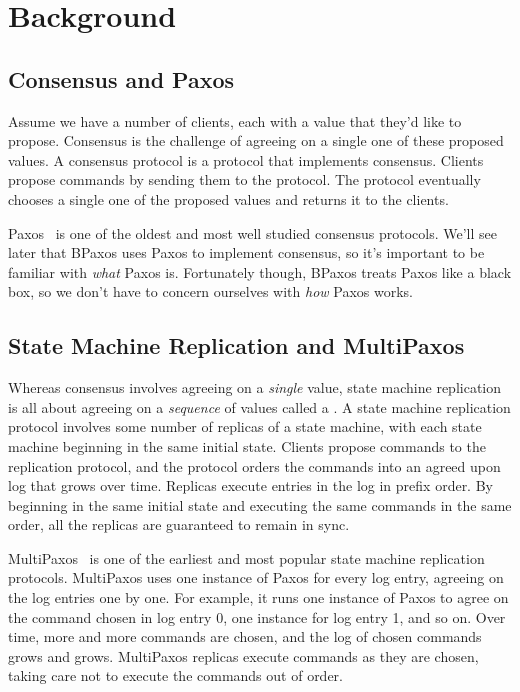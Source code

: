 \section{Background}

\subsection{Consensus and Paxos}
Assume we have a number of clients, each with a value that they'd like to
propose. Consensus is the challenge of agreeing on a single one of these
proposed values. A consensus protocol is a protocol that implements consensus.
Clients propose commands by sending them to the protocol. The protocol
eventually chooses a single one of the proposed values and returns it to the
clients.

Paxos~\cite{lamport1998part, lamport2001paxos} is one of the oldest and most
well studied consensus protocols. We'll see later that BPaxos uses Paxos to
implement consensus, so it's important to be familiar with \emph{what} Paxos
is. Fortunately though, BPaxos treats Paxos like a black box, so we don't have
to concern ourselves with \emph{how} Paxos works.

\subsection{State Machine Replication and MultiPaxos}
Whereas consensus involves agreeing on a \emph{single} value, state machine
replication is all about agreeing on a \emph{sequence} of values called a
. A state machine replication protocol involves some number of
replicas of a state machine, with each state machine beginning in the same
initial state. Clients propose commands to the replication protocol, and the
protocol orders the commands into an agreed upon log that grows over time.
Replicas execute entries in the log in prefix order. By beginning in the same
initial state and executing the same commands in the same order, all the
replicas are guaranteed to remain in sync.

MultiPaxos~\cite{van2015paxos} is one of the earliest and most popular state
machine replication protocols. MultiPaxos uses one instance of Paxos for every
log entry, agreeing on the log entries one by one. For example, it runs one
instance of Paxos to agree on the command chosen in log entry 0, one instance
for log entry 1, and so on. Over time, more and more commands are chosen, and
the log of chosen commands grows and grows. MultiPaxos replicas execute
commands as they are chosen, taking care not to execute the commands out of
order.

